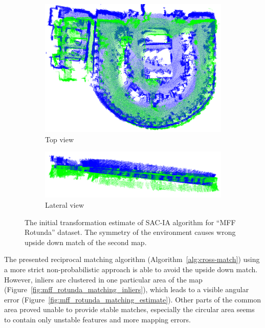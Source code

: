 \begin{figure}
    \centering
    \begin{subfigure}[b]{\textwidth}
        \includegraphics[width=\textwidth]{../img/mff_rotunda_sac_top.png}
        \caption{Top view}
    \end{subfigure}
    \begin{subfigure}[b]{\textwidth}
        \includegraphics[width=\textwidth]{../img/mff_rotunda_sac_lateral.png}
        \caption{Lateral view}
    \end{subfigure}
    \caption[\gls{SAC-IA} initial estimate for ``MFF Rotunda '' dataset.]{The initial transformation estimate of \gls{SAC-IA} algorithm for ``MFF Rotunda'' dataset. The symmetry of the environment causes wrong upside down match of the second map.}
    \label{fig:mff_rotunda_sac}
\end{figure}

The presented reciprocal matching algorithm (Algorithm~\ref{alg:cross-match}) using a more strict non-probabilistic approach is able to avoid the upside down match. However, inliers are clustered in one particular area of the map (Figure~\ref{fig:mff_rotunda_matching_inliers}), which leads to a visible angular error (Figure~\ref{fig:mff_rotunda_matching_estimate}). Other parts of the common area proved unable to provide stable matches, especially the circular area seems to contain only unstable features and more mapping errors.

